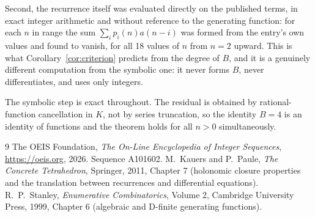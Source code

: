 \documentclass[11pt,a4paper]{article}
\theoremstyle{plain}
\theoremstyle{definition}
\begin{document}
Second, the recurrence itself was evaluated directly on the published terms, in exact
integer arithmetic and without reference to the generating function: for each $n$ in range
the sum $\sum_{i}p_{i}(n)a(n-i)$ was formed from the entry's own values and found to
vanish, for all 18 values of $n$ from $n=2$ upward. This is what
Corollary~\ref{cor:criterion} predicts from the degree of $B$, and it is a genuinely
different computation from the symbolic one: it never forms $B$, never differentiates, and
uses only integers.

The symbolic step is exact throughout. The residual is obtained by rational-function
cancellation in $K$, not by series truncation, so the identity $B=4$ is an
identity of functions and the theorem holds for all $n>0$ simultaneously.

\begin{thebibliography}{9}
 The OEIS Foundation, \emph{The On-Line Encyclopedia of Integer Sequences},
\url{https://oeis.org}, 2026. Sequence A101602.
 M.~Kauers and P.~Paule, \emph{The Concrete Tetrahedron}, Springer, 2011,
Chapter 7 (holonomic closure properties and the translation between recurrences and
differential equations).
 R.~P.~Stanley, \emph{Enumerative Combinatorics}, Volume 2, Cambridge
University Press, 1999, Chapter 6 (algebraic and D-finite generating functions).
\end{thebibliography}
\end{document}
